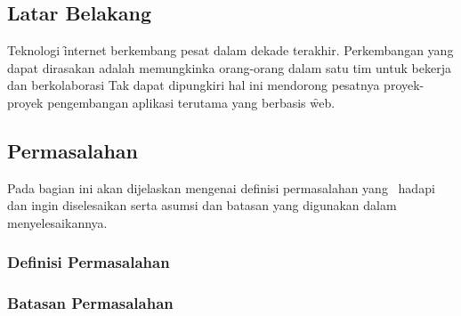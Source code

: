 \chapter{\babSatu}


\section{Latar Belakang}
Teknologi \f{internet} berkembang pesat dalam dekade terakhir. Perkembangan yang dapat dirasakan adalah memungkinka orang-orang dalam satu tim untuk bekerja dan berkolaborasi Tak dapat dipungkiri hal ini mendorong pesatnya proyek-proyek pengembangan aplikasi terutama yang berbasis \f{web}. 


\section{Permasalahan}
Pada bagian ini akan dijelaskan mengenai definisi permasalahan 
yang \saya~hadapi dan ingin diselesaikan serta asumsi dan batasan 
yang digunakan dalam menyelesaikannya.


\subsection{Definisi Permasalahan}


\subsection{Batasan Permasalahan}


